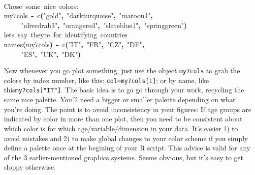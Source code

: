 \documentclass[a4paper]{article}
\newcommand{\hlfunctioncall}[1]{\textcolor[rgb]{1,0,0}{#1}}%
\newcommand{\hlstring}[1]{\textcolor[rgb]{0.6,0.6,1}{#1}}%
\newcommand{\hlkeyword}[1]{\textcolor[rgb]{0,0,0}{\textbf{#1}}}%
\newcommand{\hlcomment}[1]{\textcolor[rgb]{0.8,0.8,0.8}{#1}}%
\newcommand{\hlassignement}[1]{\textcolor[rgb]{0.215686274509804,0.215686274509804,0.384313725490196}{\textbf{#1}}}%
\newcommand{\hlsymbol}[1]{\textcolor[rgb]{0,0,0}{#1}}%
\newcommand{\hlprompt}[1]{\textcolor[rgb]{0,0,0}{#1}}%
\newcommand{\hlstd}[1]{\textcolor[rgb]{0,0,0}{#1}}%
\newenvironment{Houtput}{\raggedright}{%
%
}
\begin{document}
\begin{Houtput}
\hspace*{\fill}\\
\hlstd{}\ttfamily\noindent
\hlprompt{\usebox{\hlnormalsizeboxgreaterthan}{\ }}\hlcomment{\usebox{\hlnormalsizeboxhash}{\ }Chose{\ }some{\ }nice{\ }colors:}\mbox{}
\normalfont
\hspace*{\fill}\\
\hlstd{}\ttfamily\noindent
\hlprompt{\usebox{\hlnormalsizeboxgreaterthan}{\ }}\hlsymbol{my7cols}{\ }\hlassignement{\usebox{\hlnormalsizeboxlessthan}-}{\ }\hlfunctioncall{c}\hlkeyword{(}\hlstring{"gold"}\hlkeyword{,}{\ }\hlstring{"darkturquoise"}\hlkeyword{,}{\ }\hlstring{"maroon1"}\hlkeyword{,}\hspace*{\fill}\\
\hlstd{}\hlprompt{{\ }}{\ }{\ }{\ }{\ }\hlstring{"olivedrab3"}\hlkeyword{,}{\ }\hlstring{"orangered"}\hlkeyword{,}{\ }\hlstring{"slateblue1"}\hlkeyword{,}{\ }\hlstring{"springgreen"}\hlkeyword{)}\mbox{}
\normalfont
\hspace*{\fill}\\
\hlstd{}\ttfamily\noindent
\hlprompt{\usebox{\hlnormalsizeboxgreaterthan}{\ }}\hlcomment{\usebox{\hlnormalsizeboxhash}{\ }let\usebox{\hlnormalsizeboxsinglequote}s{\ }say{\ }they\usebox{\hlnormalsizeboxsinglequote}re{\ }for{\ }identifying{\ }countries}\mbox{}
\normalfont
\hspace*{\fill}\\
\hlstd{}\ttfamily\noindent
\hlprompt{\usebox{\hlnormalsizeboxgreaterthan}{\ }}\hlfunctioncall{names}\hlkeyword{(}\hlsymbol{my7cols}\hlkeyword{)}{\ }\hlassignement{\usebox{\hlnormalsizeboxlessthan}-}{\ }\hlfunctioncall{c}\hlkeyword{(}\hlstring{"IT"}\hlkeyword{,}{\ }\hlstring{"FR"}\hlkeyword{,}{\ }\hlstring{"CZ"}\hlkeyword{,}{\ }\hlstring{"DE"}\hlkeyword{,}\hspace*{\fill}\\
\hlstd{}\hlprompt{{\ }}{\ }{\ }{\ }{\ }\hlstring{"ES"}\hlkeyword{,}{\ }\hlstring{"UK"}\hlkeyword{,}{\ }\hlstring{"DK"}\hlkeyword{)}\mbox{}
\normalfont
\hspace*{\fill}\\
\hlstd{}
\end{Houtput}

Now whenever you go plot something, just use the object \texttt{my7cols} to grab the colors by index number, like this: \texttt{col=my7cols[1]}; or by name, like this\texttt{my7cols["IT"]}. The basic idea is to go go through your work, recycling the same nice palette. You'll need a bigger or smaller palette depending on what you're doing. The point is to avoid inconsistency in your figures: If age groups are indicated by color in more than one plot, then you need to be consistent about which color is for which age/variable/dimension in your data. It's easier 1) to avoid mistakes and 2) to make global changes to your color scheme if you simply define a palette once at the begining of your R script. This advice is valid for any of the 3 earlier-mentioned graphics systems. Seems obvious, but it's easy to get sloppy otherwise.
\end{document}
